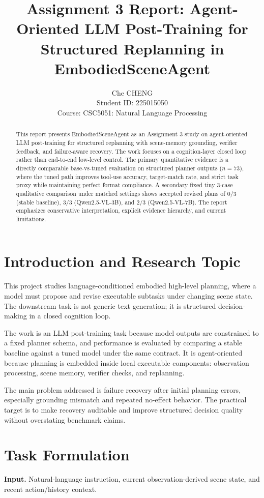 \documentclass{article}
\title{Assignment 3 Report: Agent-Oriented LLM Post-Training for Structured Replanning in EmbodiedSceneAgent}
\author{
Che CHENG \\
Student ID: 225015050 \\
Course: CSC5051: Natural Language Processing
}
\begin{document}
\maketitle

\begin{abstract}
This report presents EmbodiedSceneAgent as an Assignment 3 study on agent-oriented LLM post-training for structured replanning with scene-memory grounding, verifier feedback, and failure-aware recovery. The work focuses on a cognition-layer closed loop rather than end-to-end low-level control. The primary quantitative evidence is a directly comparable base-vs-tuned evaluation on structured planner outputs ($n=73$), where the tuned path improves tool-use accuracy, target-match rate, and strict task proxy while maintaining perfect format compliance. A secondary fixed tiny 3-case qualitative comparison under matched settings shows accepted revised plans of $0/3$ (stable baseline), $3/3$ (Qwen2.5-VL-3B), and $2/3$ (Qwen2.5-VL-7B). The report emphasizes conservative interpretation, explicit evidence hierarchy, and current limitations.
\end{abstract}

\section{Introduction and Research Topic}
This project studies language-conditioned embodied high-level planning, where a model must propose and revise executable subtasks under changing scene state. The downstream task is not generic text generation; it is structured decision-making in a closed cognition loop.

The work is an LLM post-training task because model outputs are constrained to a fixed planner schema, and performance is evaluated by comparing a stable baseline against a tuned model under the same contract. It is agent-oriented because planning is embedded inside local executable components: observation processing, scene memory, verifier checks, and replanning.

The main problem addressed is failure recovery after initial planning errors, especially grounding mismatch and repeated no-effect behavior. The practical target is to make recovery auditable and improve structured decision quality without overstating benchmark claims.

\section{Task Formulation}
\textbf{Input.} Natural-language instruction, current observation-derived scene state, and recent action/history context.
\end{document}
